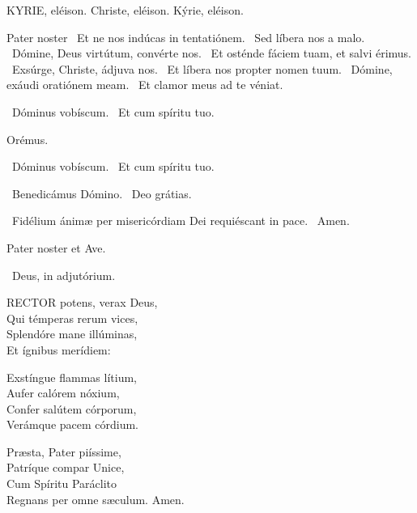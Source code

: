 
KYRIE, eléison. Christe, eléison. Kýrie, eléison.

Pater noster  \V\ Et ne nos indúcas in tentatiónem. \R\ Sed líbera nos a malo. \V\ Dómine, Deus virtútum, convérte nos. \R\ Et osténde fáciem tuam, et salvi érimus. \V\ Exsúrge, Christe, ádjuva nos. \R\ Et líbera nos propter nomen tuum. \V\ Dómine, exáudi oratiónem meam. \R\ Et clamor meus ad te véniat.


\V\ Dóminus vobíscum. \R\ Et cum spíritu tuo.

Orémus.



\V\ Dóminus vobíscum. \R\ Et cum spíritu tuo.

\V\ Benedicámus Dómino. \R\ Deo grátias.

\V\ Fidélium ánimæ per misericórdiam Dei requiéscant in pace. \R\ Amen.



Pater noster et Ave.

\V\ Deus, in adjutórium.


\lettrine[lines=2]{R}{ECTOR} potens, verax Deus,\\
Qui témperas rerum vices,\\
Splendóre mane illúminas,\\
Et ígnibus merídiem:

Exstíngue flammas lítium,\\
Aufer calórem nóxium,\\
Confer salútem córporum,\\
Verámque pacem córdium.

Præsta, Pater piíssime,\\
Patríque compar Unice,\\
Cum Spíritu Paráclito\\
Regnans per omne sæculum. Amen.


